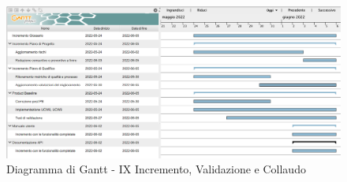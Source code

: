 \begin{figure}[H]
	\centering
	\includegraphics[scale=0.35]{Sezioni/gantt/IX_incremento.png}
	\caption{Diagramma di Gantt - IX Incremento, Validazione e Collaudo}
\end{figure}

\pagebreak

